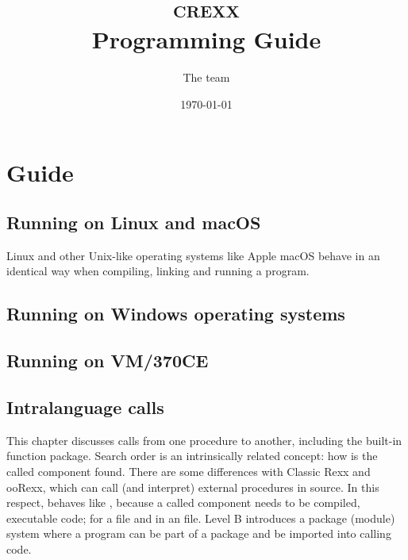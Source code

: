 


\renewcommand{\isbn}{978-90-819090-1-3}
\setcounter{tocdepth}{1}
\title{\textsc{crexx}\protect{}\\Programming Guide}

\author{The \crexx{} team}
\date{\null\hfill \today}
\maketitle
{}
\pagestyle{plain}
\frontmatter
{}
\pagestyle{fancy}

\tableofcontents

\newpage
{}
\frontmatter
\large




\mainmatter

\part{Guide}


\chapter{Running \crexx{} on Linux and macOS}
Linux and other Unix-like operating systems like Apple macOS behave in
an identical way when compiling, linking and running a \crexx{}
program.

\chapter{Running \crexx{} on Windows operating systems}
\chapter{Running \crexx{} on VM/370CE}
\chapter{Intralanguage calls}
This chapter discusses calls from one \crexx{} procedure to another,
including the built-in function package. Search order is an
intrinsically related concept: how is the called component found. There
are some differences with Classic Rexx and ooRexx, which can call (and interpret)
external procedures in source. In this respect, \crexx{} behaves like
\nr{}, because a called component needs to be compiled, executable
code; for \nr{} a  file and in \crexx{} an 
file. Level B introduces a package (module) system where a program can
be part of a package and be imported into calling code.
